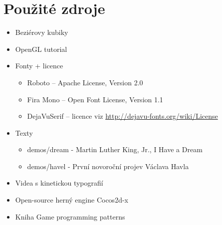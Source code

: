 \documentclass[12pt,a4paper,titlepage,final]{report}
\begin{document}


\chapter{Použité zdroje}

\begin{itemize}
\item Beziérovy kubiky \cite{bezier}
\item OpenGL tutorial \cite{learnopengl}
\item Fonty + licence
\begin{itemize}
\item Roboto -- Apache License, Version 2.0
\item Fira Mono -- Open Font License, Version 1.1
\item DejaVuSerif -- licence viz \url{http://dejavu-fonts.org/wiki/License}
\end{itemize}
\item Texty
\begin{itemize}
\item demos/dream - Martin Luther King, Jr., I Have a Dream \cite{speech:dream}
\item demos/havel - První novoroční projev Václava Havla \cite{speech:havel}
\end{itemize}
\item Videa s kinetickou typografií \cite{video:soe} \cite{video:kity}
\item Open-source herný engine Cocos2d-x \cite{cocos}
\item Kniha Game programming patterns \cite{patterns}
\end{itemize}  



\end{document}
